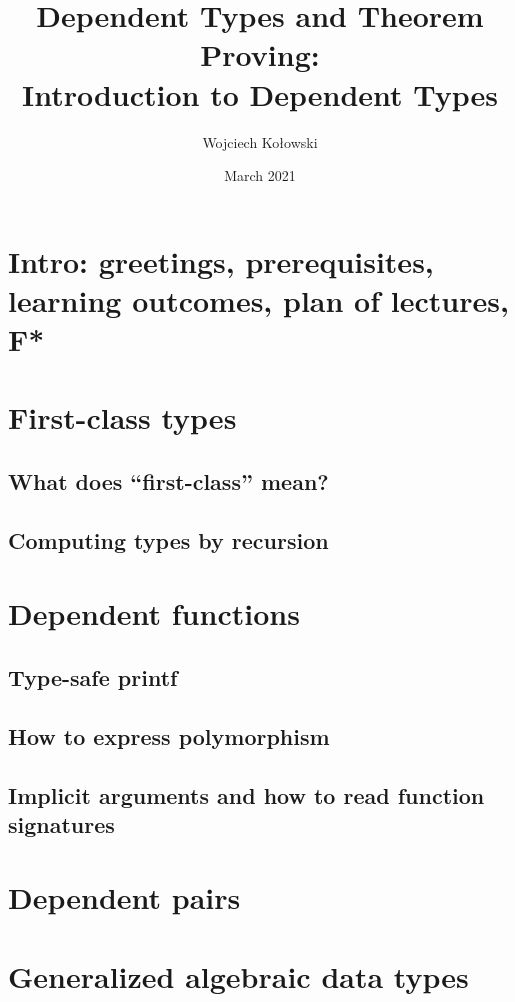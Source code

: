 \documentclass{beamer}
\title{Dependent Types and Theorem Proving: \\Introduction to Dependent Types}
\author{Wojciech Kołowski}
\date{March 2021}
\begin{document}
\frame{\titlepage}
\frame{\tableofcontents}

\section{Intro: greetings, prerequisites, learning outcomes, plan of lectures, F*}

\section{First-class types}
\subsection{What does ``first-class'' mean?}
\subsection{Computing types by recursion}

\section{Dependent functions}
\subsection{Type-safe printf}
\subsection{How to express polymorphism}
\subsection{Implicit arguments and how to read function signatures}

\section{Dependent pairs}
\subsection{}

\section{Generalized algebraic data types}
\end{document}
